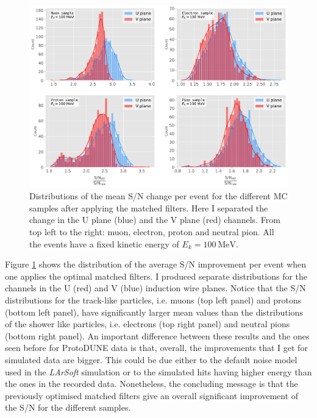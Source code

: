 \begin{figure}[h!]
	\centering
	\includegraphics[width=0.9\linewidth]{Images/Matched_Filter/larsoft_sn_hists.pdf}
	\caption[Distributions of the mean S/N change per event for the different MC samples after applying the matched filters.]{Distributions of the mean S/N change per event for the different MC samples after applying the matched filters. Here I separated the change in the U plane (blue) and the V plane (red) channels. From top left to the right: muon, electron, proton and neutral pion. All the events have a fixed kinetic energy of $E_{k} = 100 \ \mathrm{MeV}$.}
	\label{fig:mono_summary_hist}
\end{figure}

Figure \ref{fig:mono_summary_hist} shows the distribution of the average S/N improvement per event when one applies the optimal matched filters. I produced separate distributions for the channels in the U (red) and V (blue) induction wire planes. Notice that the S/N distributions for the track-like particles, i.e. muons (top left panel) and protons (bottom left panel), have significantly larger mean values than the distributions of the shower like particles, i.e. electrons (top right panel) and neutral pions (bottom right panel). An important difference between these results and the ones seen before for ProtoDUNE data is that, overall, the improvements that I get for simulated data are bigger. This could be due either to the default noise model used in the \textit{LArSoft} simulation or to the simulated hits having higher energy than the ones in the recorded data. Nonetheless, the concluding message is that the previously optimised matched filters give an overall significant improvement of the S/N for the different samples.

